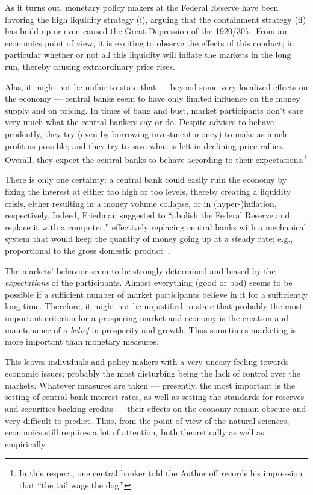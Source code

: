 \documentclass[aps,rmp,preprint,amsfonts,showpacs,showkeys]{revtex4}
\begin{document}
As it turns out, monetary policy makers at the Federal Reserve have been favoring the high liquidity strategy (i),
arguing that the containment strategy (ii) has build up or even caused the Great Depression of the 1920/30's.
From an economics point of view, it is exciting to observe the effects of this conduct;
in particular whether or not all this liquidity will inflate the markets in the long run, thereby causing extraordinary price rises.

Alas, it might not be unfair to state that --- beyond some very localized effects on the economy --- central banks seem to have only limited influence
on the money supply and on pricing.
In times of bang and bust, market participants don't care very much what the central bankers say or do.
Despite advises to behave prudently, they try (even by borrowing investment money) to make as much profit as possible; and they try to save what is left in declining price rallies.
Overall, they expect the central banks to behave according to their expectations.\footnote{
In this respect, one central banker told the Author off records his impression that ``the tail wags the dog.''}

There is only one certainty:  a central bank could easily ruin the economy by fixing the interest at either too high or too levels,
thereby creating a liquidity crisis, either resulting in a money volume collapse, or in (hyper-)inflation, respectively.
Indeed, Friedman suggested  to ``abolish the Federal Reserve and replace it with a computer,'' effectively
replacing central banks with a mechanical system that would keep the quantity of money going up at a steady rate;
e.g.,  proportional to the gross domestic product~\cite{Friedman-2008}.


The markets' behavior seem to be strongly determined and biased by the {\em expectations} of the participants.
Almost everything (good or bad) seems to be possible if
a sufficient number of market participants believe in it for a sufficiently long time.
Therefore, it might not be unjustified to state that probably the most
important criterion for a prospering market and economy is the creation and maintenance  of a {\em belief} in prosperity and growth.
Thus sometimes marketing is more important than monetary measures.


This leaves individuals and policy makers with a very uneasy feeling towards economic issues; probably the most disturbing being the lack of control over the markets.
Whatever measures are taken --- presently, the most important is the setting of central bank interest rates,
as well as setting the standards for reserves and securities backing credits --- their effects on the economy remain obscure and
very difficult to predict.
Thus, from the point of view of the natural sciences, economics still requires a lot of attention, both theoretically as well as empirically.
\end{document}
